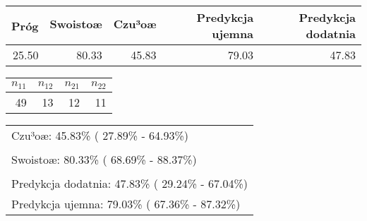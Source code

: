 

 \bigskip  %
\begin{tabular}{rrrrr}
  \hline
Próg & Swoistoæ & Czu³oæ & Predykcja ujemna & Predykcja dodatnia \\ 
  \hline
25.50 & 80.33 & 45.83 & 79.03 & 47.83 \\ 
   \hline
\end{tabular}
 

 \bigskip  %
\begin{tabular}{rrrr}
  \hline
$n_{11}$ & $n_{12}$ & $n_{21}$ & $n_{22}$ \\ 
  \hline
49 & 13 & 12 & 11 \\ 
   \hline
\end{tabular}
 

 \bigskip  %
\begin{tabular}{l}
  \hline
  \hline
Czu³oæ: 45.83\% ( 27.89\% - 64.93\%) \\ 
  Swoistoæ: 80.33\% ( 68.69\% - 88.37\%) \\ 
  Predykcja dodatnia: 47.83\% ( 29.24\% - 67.04\%) \\ 
  Predykcja ujemna: 79.03\% ( 67.36\% - 87.32\%) \\ 
   \hline
\end{tabular}

